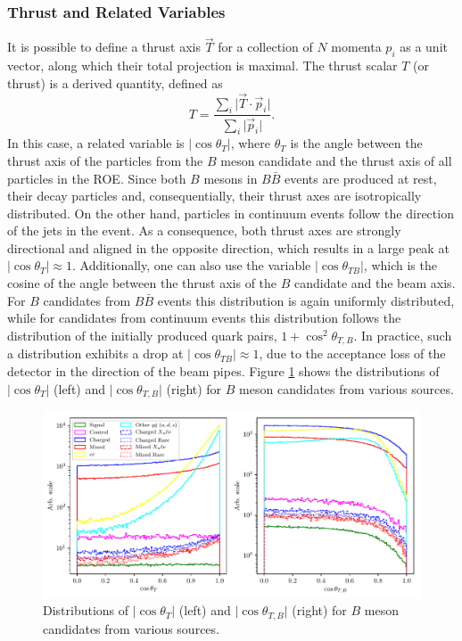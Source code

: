 \subsubsection{Thrust and Related Variables}
It is possible to define a thrust axis $\vec{T}$ for a collection of $N$ momenta $p_i$ as a unit vector, along which their total projection is maximal. The thrust scalar $T$ (or thrust) is a derived quantity, defined as
\begin{equation}
T = \frac{\sum_{i}\vert \vec{T} \cdot \vec{p}_i\vert}{\sum_{i}\vert \vec{p}_i\vert}.
\end{equation}
In this case, a related variable is $\vert \cos\theta_T\vert$, where $\theta_T$ is the angle between the thrust axis of the particles from the $B$ meson candidate and the thrust axis of all particles in the ROE. Since both $B$ mesons in $B \bar B$ events are produced at rest, their decay particles and, consequentially, their thrust axes are isotropically distributed. On the other hand, particles in continuum events follow the direction of the jets in the event. As a consequence, both thrust axes are strongly directional and aligned in the opposite direction, which results in a large peak at $\vert \cos\theta_T\vert \approx 1$. Additionally, one can also use the variable $\vert \cos\theta_{TB}\vert $, which is the cosine of the angle between the thrust axis of the $B$ candidate and the beam axis. For $B$ candidates from $B \bar B$ events this distribution is again uniformly distributed, while for candidates from continuum events this distribution follows the distribution of the initially produced quark pairs, $1+\cos^2\theta_{T,B}$. In practice, such a distribution exhibits a drop at $\vert \cos\theta_{TB}\vert \approx 1$, due to the acceptance loss of the detector in the direction of the beam pipes. Figure \ref{fig:cosplots} shows the distributions of $\vert \cos\theta_T\vert$ (left) and $\vert \cos\theta_{T,B}\vert$ (right) for $B$ meson candidates from various sources.

\begin{figure}[H]
	\centering
	\captionsetup{width=0.8\linewidth}
	\includegraphics[width=\linewidth]{fig/cs_cosplots}
	\caption{Distributions of $\vert \cos\theta_T\vert$ (left) and $\vert \cos\theta_{T,B}\vert$ (right) for $B$ meson candidates from various sources.}
	\label{fig:cosplots}
\end{figure}

